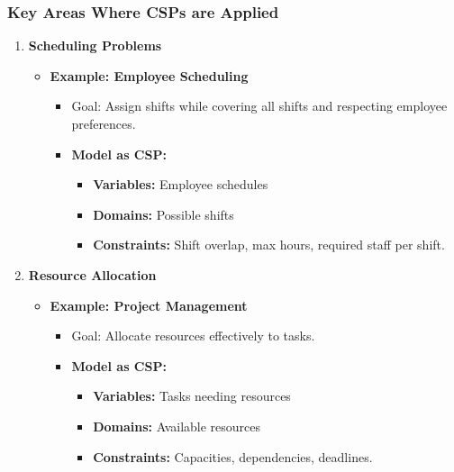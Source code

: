 \documentclass[aspectratio=169]{beamer}
\begin{document}
\begin{frame}[fragile]
    \frametitle{Key Areas Where CSPs are Applied}
    \begin{enumerate}
        \item \textbf{Scheduling Problems}
        \begin{itemize}
            \item \textbf{Example: Employee Scheduling}
            \begin{itemize}
                \item Goal: Assign shifts while covering all shifts and respecting employee preferences.
                \item \textbf{Model as CSP:}
                \begin{itemize}
                    \item \textbf{Variables:} Employee schedules
                    \item \textbf{Domains:} Possible shifts
                    \item \textbf{Constraints:} Shift overlap, max hours, required staff per shift.
                \end{itemize}
            \end{itemize}
        \end{itemize}
        \item \textbf{Resource Allocation}
        \begin{itemize}
            \item \textbf{Example: Project Management}
            \begin{itemize}
                \item Goal: Allocate resources effectively to tasks.
                \item \textbf{Model as CSP:}
                \begin{itemize}
                    \item \textbf{Variables:} Tasks needing resources
                    \item \textbf{Domains:} Available resources
                    \item \textbf{Constraints:} Capacities, dependencies, deadlines.
                \end{itemize}
            \end{itemize}
        \end{itemize}
    \end{enumerate}
\end{frame}
\end{document}
